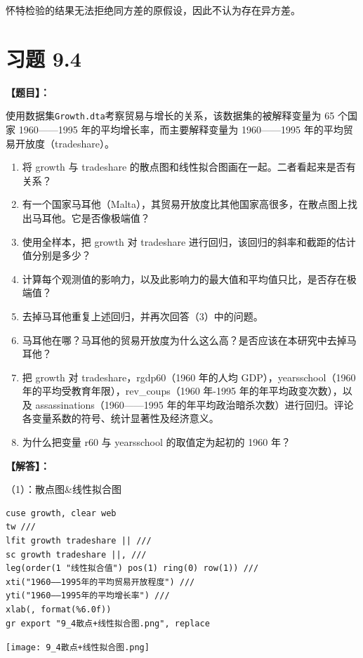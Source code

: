 \documentclass[cn,fancy,blue,11pt]{elegantbook}
\begin{document}
怀特检验的结果无法拒绝同方差的原假设，因此不认为存在异方差。

\hypertarget{section-48}{%
\section{习题 9.4}\label{section-48}}

\textbf{【题目】：}

使用数据集\lstinline{Growth.dta}考察贸易与增长的关系，该数据集的被解释变量为 65 个国家 1960------1995 年的平均增长率，而主要解释变量为 1960------1995 年的平均贸易开放度（tradeshare）。

\begin{enumerate}
\item
  将 growth 与 tradeshare 的散点图和线性拟合图画在一起。二者看起来是否有关系？
\item
  有一个国家马耳他（Malta），其贸易开放度比其他国家高很多，在散点图上找出马耳他。它是否像极端值？
\item
  使用全样本，把 growth 对 tradeshare 进行回归，该回归的斜率和截距的估计值分别是多少？
\item
  计算每个观测值的影响力，以及此影响力的最大值和平均值只比，是否存在极端值？
\item
  去掉马耳他重复上述回归，并再次回答（3）中的问题。
\item
  马耳他在哪？马耳他的贸易开放度为什么这么高？是否应该在本研究中去掉马耳他？
\item
  把 growth 对 tradeshare，rgdp60（1960 年的人均 GDP），yearsschool（1960 年的平均受教育年限），rev\_coups（1960 年-1995 年的年平均政变次数），以及 assassinations（1960------1995 年的年平均政治暗杀次数）进行回归。评论各变量系数的符号、统计显著性及经济意义。
\item
  为什么把变量 r60 与 yearsschool 的取值定为起初的 1960 年？
\end{enumerate}

\textbf{【解答】：}

（1）：散点图\&线性拟合图

\begin{lstlisting}
cuse growth, clear web
tw ///
lfit growth tradeshare || ///
sc growth tradeshare ||, ///
leg(order(1 "线性拟合值") pos(1) ring(0) row(1)) ///
xti("1960——1995年的平均贸易开放程度") ///
yti("1960——1995年的平均增长率") ///
xlab(, format(%6.0f))
gr export "9_4散点+线性拟合图.png", replace
\end{lstlisting}

\noindent\texttt{[image: 9\_4散点+线性拟合图.png]}
\end{document}
